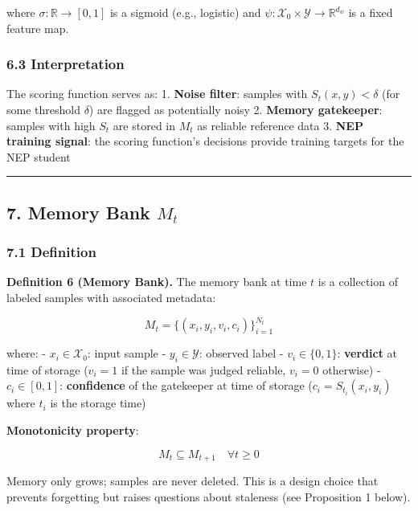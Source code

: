 \documentclass[
  12pt,
]{article}
\begin{document}
where \(\sigma: \mathbb{R} \to [0,1]\) is a sigmoid (e.g., logistic) and
\(\psi: \mathcal{X}_0 \times \mathcal{Y} \to \mathbb{R}^{d_w}\) is a
fixed feature map.

\subsubsection{6.3 Interpretation}\label{interpretation}

The scoring function serves as: 1. \textbf{Noise filter}: samples with
\(S_t(x, y) < \delta\) (for some threshold \(\delta\)) are flagged as
potentially noisy 2. \textbf{Memory gatekeeper}: samples with high
\(S_t\) are stored in \(M_t\) as reliable reference data 3. \textbf{NEP
training signal}: the scoring function's decisions provide training
targets for the NEP student

\begin{center}\rule{0.5\linewidth}{0.5pt}\end{center}

\subsection{\texorpdfstring{7. Memory Bank
\(M_t\)}{7. Memory Bank M\_t}}\label{memory-bank-m_t}

\subsubsection{7.1 Definition}\label{definition-3}

\textbf{Definition 6 (Memory Bank).} The memory bank at time \(t\) is a
collection of labeled samples with associated metadata:

\[M_t = \bigl\{ (x_i, y_i, v_i, c_i) \bigr\}_{i=1}^{N_t}\]

where: - \(x_i \in \mathcal{X}_0\): input sample -
\(y_i \in \mathcal{Y}\): observed label - \(v_i \in \{0, 1\}\):
\textbf{verdict} at time of storage (\(v_i = 1\) if the sample was
judged reliable, \(v_i = 0\) otherwise) - \(c_i \in [0,1]\):
\textbf{confidence} of the gatekeeper at time of storage
(\(c_i = S_{t_i}(x_i, y_i)\) where \(t_i\) is the storage time)

\textbf{Monotonicity property}:

\[M_t \subseteq M_{t+1} \quad \forall t \geq 0\]

Memory only grows; samples are never deleted. This is a design choice
that prevents forgetting but raises questions about staleness (see
Proposition 1 below).
\end{document}
